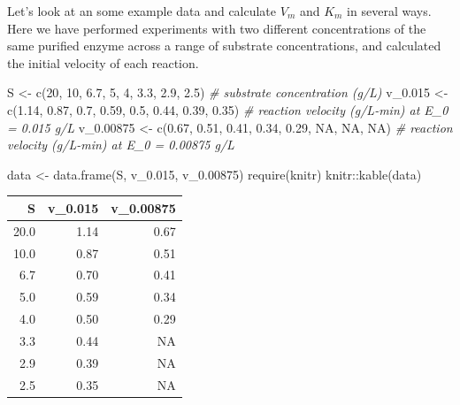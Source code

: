 \documentclass[
]{article}
\newenvironment{Shaded}{\begin{snugshade}}{\end{snugshade}}
\newcommand{\CommentTok}[1]{\textcolor[rgb]{0.56,0.35,0.01}{\textit{#1}}}
\newcommand{\ConstantTok}[1]{\textcolor[rgb]{0.00,0.00,0.00}{#1}}
\newcommand{\DecValTok}[1]{\textcolor[rgb]{0.00,0.00,0.81}{#1}}
\newcommand{\FloatTok}[1]{\textcolor[rgb]{0.00,0.00,0.81}{#1}}
\newcommand{\FunctionTok}[1]{\textcolor[rgb]{0.00,0.00,0.00}{#1}}
\newcommand{\NormalTok}[1]{#1}
\newcommand{\OtherTok}[1]{\textcolor[rgb]{0.56,0.35,0.01}{#1}}
\newcommand{\SpecialCharTok}[1]{\textcolor[rgb]{0.00,0.00,0.00}{#1}}
\begin{document}
Let's look at an some example data and calculate \(V_m\) and \(K_m\) in several ways. Here we have performed experiments with two different concentrations of the same purified enzyme across a range of substrate concentrations, and calculated the initial velocity of each reaction.

\begin{Shaded}
\begin{Highlighting}[]
\NormalTok{S }\OtherTok{\textless{}{-}} \FunctionTok{c}\NormalTok{(}\DecValTok{20}\NormalTok{, }\DecValTok{10}\NormalTok{, }\FloatTok{6.7}\NormalTok{, }\DecValTok{5}\NormalTok{, }\DecValTok{4}\NormalTok{, }\FloatTok{3.3}\NormalTok{, }\FloatTok{2.9}\NormalTok{, }\FloatTok{2.5}\NormalTok{)  }\CommentTok{\# substrate concentration (g/L)}
\NormalTok{v\_0}\FloatTok{.015} \OtherTok{\textless{}{-}} \FunctionTok{c}\NormalTok{(}\FloatTok{1.14}\NormalTok{, }\FloatTok{0.87}\NormalTok{, }\FloatTok{0.7}\NormalTok{, }\FloatTok{0.59}\NormalTok{, }\FloatTok{0.5}\NormalTok{, }\FloatTok{0.44}\NormalTok{, }\FloatTok{0.39}\NormalTok{, }
    \FloatTok{0.35}\NormalTok{)  }\CommentTok{\# reaction velocity (g/L{-}min) at E\_0 = 0.015 g/L}
\NormalTok{v\_0}\FloatTok{.00875} \OtherTok{\textless{}{-}} \FunctionTok{c}\NormalTok{(}\FloatTok{0.67}\NormalTok{, }\FloatTok{0.51}\NormalTok{, }\FloatTok{0.41}\NormalTok{, }\FloatTok{0.34}\NormalTok{, }\FloatTok{0.29}\NormalTok{, }\ConstantTok{NA}\NormalTok{, }\ConstantTok{NA}\NormalTok{, }
    \ConstantTok{NA}\NormalTok{)  }\CommentTok{\# reaction velocity (g/L{-}min) at E\_0 = 0.00875 g/L}

\NormalTok{data }\OtherTok{\textless{}{-}} \FunctionTok{data.frame}\NormalTok{(S, v\_0}\FloatTok{.015}\NormalTok{, v\_0}\FloatTok{.00875}\NormalTok{)}
\FunctionTok{require}\NormalTok{(knitr)}
\NormalTok{knitr}\SpecialCharTok{::}\FunctionTok{kable}\NormalTok{(data)}
\end{Highlighting}
\end{Shaded}

\begin{tabular}{r|r|r}
\hline
S & v\_0.015 & v\_0.00875\\
\hline
20.0 & 1.14 & 0.67\\
\hline
10.0 & 0.87 & 0.51\\
\hline
6.7 & 0.70 & 0.41\\
\hline
5.0 & 0.59 & 0.34\\
\hline
4.0 & 0.50 & 0.29\\
\hline
3.3 & 0.44 & NA\\
\hline
2.9 & 0.39 & NA\\
\hline
2.5 & 0.35 & NA\\
\hline
\end{tabular}
\end{document}
